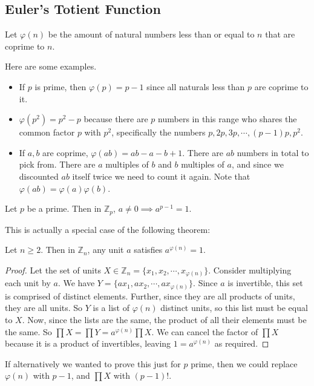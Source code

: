 \documentclass{article}
\begin{document}
\subsection{Euler's Totient Function}
\begin{definition}
	Let $\varphi(n)$ be the amount of natural numbers less than or equal to $n$ that are coprime to $n$.
\end{definition}
Here are some examples.
\begin{itemize}
	\item If $p$ is prime, then $\varphi(p) = p - 1$ since all naturals less than $p$ are coprime to it.
	\item $\varphi(p^2) = p^2 - p$ because there are $p$ numbers in this range who shares the common factor $p$ with $p^2$, specifically the numbers $p, 2p, 3p, \cdots, (p-1)p, p^2$.
	\item If $a, b$ are coprime, $\varphi(ab) = ab - a - b + 1$. There are $ab$ numbers in total to pick from. There are $a$ multiples of $b$ and $b$ multiples of $a$, and since we discounted $ab$ itself twice we need to count it again. Note that $\varphi(ab) = \varphi(a)\varphi(b)$.
\end{itemize}

\begin{theorem}
	Let $p$ be a prime. Then in $\mathbb Z_p$, $a \neq 0 \implies a^{p-1} = 1$.
\end{theorem}
\noindent This is actually a special case of the following theorem:
\begin{theorem}
	Let $n \geq 2$. Then in $\mathbb Z_n$, any unit $a$ satisfies $a^{\varphi(n)} = 1$.
\end{theorem}
\begin{proof}
	Let the set of units $X \in \mathbb Z_n = \{ x_1, x_2, \cdots, x_{\varphi(n)} \}$. Consider multiplying each unit by $a$. We have $Y = \{ ax_1, ax_2, \cdots, ax_{\varphi(n)} \}$. Since $a$ is invertible, this set is comprised of distinct elements. Further, since they are all products of units, they are all units. So $Y$ is a list of $\varphi(n)$ distinct units, so this list must be equal to $X$. Now, since the lists are the same, the product of all their elements must be the same. So $\prod X = \prod Y = a^{\varphi(n)}\prod X$. We can cancel the factor of $\prod X$ because it is a product of invertibles, leaving $1 = a^{\varphi(n)}$ as required.
\end{proof}
If alternatively we wanted to prove this just for $p$ prime, then we could replace $\varphi(n)$ with $p-1$, and $\prod X$ with $(p-1)!$.
\end{document}
